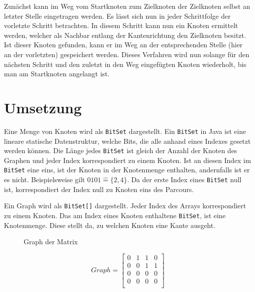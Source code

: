 \documentclass[a4paper,10pt,ngerman]{scrartcl}
\begin{document}
    Zunächst kann im Weg vom Startknoten zum Zielknoten der Zielknoten selbst an letzter Stelle eingetragen werden.
    Es lässt sich nun in jeder Schrittfolge der vorletzte Schritt betrachten.
    In diesem Schritt kann nun ein Knoten ermittelt werden,
    welcher als Nachbar entlang der Kantenrichtung den Zielknoten besitzt.
    Ist dieser Knoten gefunden,
    kann er im Weg an der entsprechenden Stelle (hier an der vorletzten) gespeichert werden.
    Dieses Verfahren wird nun solange für den nächsten Schritt und den zuletzt in den Weg eingefügten Knoten wiederholt,
    bis man am Startknoten angelangt ist.


    \section{Umsetzung}\label{sec:umsetzung}

    Eine Menge von Knoten wird als \texttt{BitSet} dargestellt.
    Ein \texttt{BitSet} in Java ist eine lineare statische Datenstruktur,
    welche Bits, die alle anhand eines Indexes gesetzt werden können.
    Die Länge jedes \texttt{BitSet} ist gleich der Anzahl der Knoten des Graphen
    und jeder Index korrespondiert zu einem Knoten.
    Ist an diesen Index im \texttt{BitSet} eine eins,
    ist der Knoten in der Knotenmenge enthalten, andernfalls ist er es nicht.
    Beispielsweise gilt $0101 \widehat{=} \{2, 4\}$.
    Da der erste Index eines \texttt{BitSet} null ist,
    korrespondiert der Index null zu Knoten eins des Parcours.

    Ein Graph wird als \texttt{BitSet[]} dargestellt.
    Jeder Index des Arrays korrespondiert zu einem Knoten.
    Das am Index eines Knoten enthaltene \texttt{BitSet}, ist eine Knotenmenge.
    Diese stellt da, zu welchen Knoten eine Kante ausgeht.




    \begin{figure}[!h]
        \centering
        \caption{Graph der Matrix}

        \label{fig:Figure3}
    \end{figure}

    \[
        Graph = \begin{bmatrix}
                    0 & 1 & 1 & 0 \\
                    0 & 0 & 1 & 1 \\
                    0 & 0 & 0 & 0 \\
                    0 & 0 & 0 & 0 \\
        \end{bmatrix}
    \]
\end{document}
